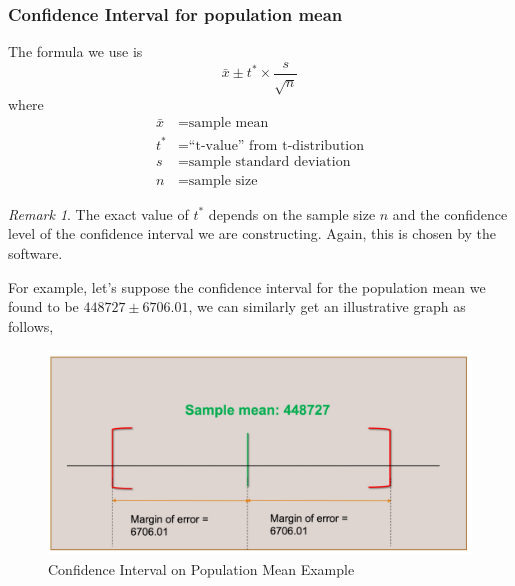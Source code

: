 \documentclass[math,code]{amznotes}
\theoremstyle{remark}
\newtheorem*{remark}{Remark}
\begin{document}
\subsubsection{Confidence Interval for population mean}
The formula we use is
\begin{equation}
    \bar{x}\pm t^*\times \frac{s}{\sqrt{n}}
\end{equation}
where
\begin{align*}
    \bar{x}&=\text{sample mean} \\
    t^*&=\text{``t-value'' from t-distribution}\\
    s&=\text{sample standard deviation}\\
    n&=\text{sample size}
\end{align*}
\begin{notebox}
    \begin{remark}
        The exact value of $t^*$ depends on the sample size $n$ and the confidence level of the confidence interval we are constructing. Again, this is chosen by the software.
    \end{remark}
\end{notebox}
For example, let's suppose the confidence interval for the population mean we found to be $448727\pm6706.01$, we can similarly get an illustrative graph as follows,
\begin{figure}[H]
    \centering
    \includegraphics[width=0.5\linewidth]{images/chapter4-confidence-interval-population-mean-example.png}
    \caption{Confidence Interval on Population Mean Example}
    \label{fig:confidence-interval-population-mean-example}
\end{figure}
\end{document}
